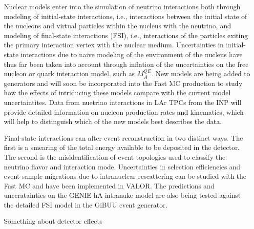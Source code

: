 Nuclear models enter into the simulation of neutrino interactions both through modeling of initial-state interactions,
i.e., interactions between the initial state of the nucleons and virtual particles within the nucleus with the neutrino, and
modeling of final-state interactions (FSI), i.e., interactions of the particles exiting the primary interaction vertex with
the nuclear medium. Uncertainties in initial-state interactions due to naive modeling of the environment of the nucleus
have thus far been taken into account through inflation of the uncertainties on the free nucleon or quark interaction
model, such as $M_{A}^{QE}$. New models are being added to generators and will soon be incorporated into the Fast MC
production to study how the effects of intriducing these models compare with the current model uncertaintites.
Data from nuetrino interactions in LAr TPCs from the INP will provide detailed information on nucleon production
rates and kinematics, which will help to distinguish which of the new models best describes the data.

Final-state interactions can alter event reconstruction in two distinct ways. The first is a smearing
of the total energy available to be deposited in the detector. The second is the misidentification of event topologies used
to classify the neutrino flavor and interaction mode. Uncertainties in selection efficiencies and event-sample migrations
due to intranuclear rescattering can be studied with the Fast MC and have been implemented in VALOR. The predictions and
unceratainties on the GENIE hA intranuke model are also being tested against the detailed FSI model in the GiBUU event
generator.

Something about detector effects %










